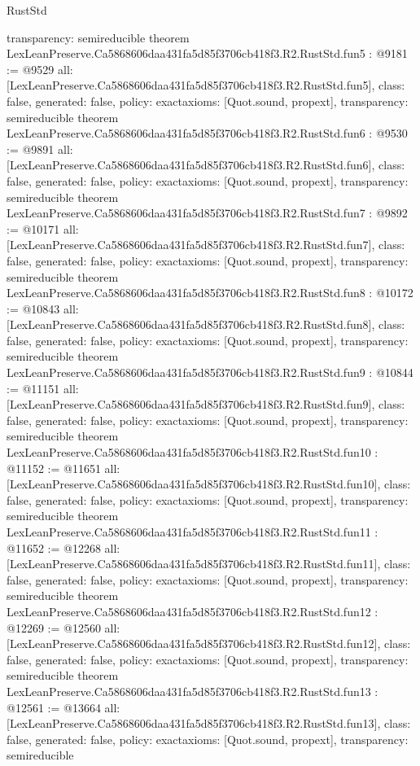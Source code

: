 \begin{lexlean}{RustStd}
\begin{coremodule}
{  transparency: semireducible
}
theorem LexLeanPreserve.Ca5868606daa431fa5d85f3706cb418f3.R2.RustStd.fun5 : @9181 := @9529 {
  all: [LexLeanPreserve.Ca5868606daa431fa5d85f3706cb418f3.R2.RustStd.fun5],
  class: false,
  generated: false,
  policy: exact{axioms: [Quot.sound, propext]},
  transparency: semireducible
}
theorem LexLeanPreserve.Ca5868606daa431fa5d85f3706cb418f3.R2.RustStd.fun6 : @9530 := @9891 {
  all: [LexLeanPreserve.Ca5868606daa431fa5d85f3706cb418f3.R2.RustStd.fun6],
  class: false,
  generated: false,
  policy: exact{axioms: [Quot.sound, propext]},
  transparency: semireducible
}
theorem LexLeanPreserve.Ca5868606daa431fa5d85f3706cb418f3.R2.RustStd.fun7 : @9892 := @10171 {
  all: [LexLeanPreserve.Ca5868606daa431fa5d85f3706cb418f3.R2.RustStd.fun7],
  class: false,
  generated: false,
  policy: exact{axioms: [Quot.sound, propext]},
  transparency: semireducible
}
theorem LexLeanPreserve.Ca5868606daa431fa5d85f3706cb418f3.R2.RustStd.fun8 : @10172 := @10843 {
  all: [LexLeanPreserve.Ca5868606daa431fa5d85f3706cb418f3.R2.RustStd.fun8],
  class: false,
  generated: false,
  policy: exact{axioms: [Quot.sound, propext]},
  transparency: semireducible
}
theorem LexLeanPreserve.Ca5868606daa431fa5d85f3706cb418f3.R2.RustStd.fun9 : @10844 := @11151 {
  all: [LexLeanPreserve.Ca5868606daa431fa5d85f3706cb418f3.R2.RustStd.fun9],
  class: false,
  generated: false,
  policy: exact{axioms: [Quot.sound, propext]},
  transparency: semireducible
}
theorem LexLeanPreserve.Ca5868606daa431fa5d85f3706cb418f3.R2.RustStd.fun10 : @11152 := @11651 {
  all: [LexLeanPreserve.Ca5868606daa431fa5d85f3706cb418f3.R2.RustStd.fun10],
  class: false,
  generated: false,
  policy: exact{axioms: [Quot.sound, propext]},
  transparency: semireducible
}
theorem LexLeanPreserve.Ca5868606daa431fa5d85f3706cb418f3.R2.RustStd.fun11 : @11652 := @12268 {
  all: [LexLeanPreserve.Ca5868606daa431fa5d85f3706cb418f3.R2.RustStd.fun11],
  class: false,
  generated: false,
  policy: exact{axioms: [Quot.sound, propext]},
  transparency: semireducible
}
theorem LexLeanPreserve.Ca5868606daa431fa5d85f3706cb418f3.R2.RustStd.fun12 : @12269 := @12560 {
  all: [LexLeanPreserve.Ca5868606daa431fa5d85f3706cb418f3.R2.RustStd.fun12],
  class: false,
  generated: false,
  policy: exact{axioms: [Quot.sound, propext]},
  transparency: semireducible
}
theorem LexLeanPreserve.Ca5868606daa431fa5d85f3706cb418f3.R2.RustStd.fun13 : @12561 := @13664 {
  all: [LexLeanPreserve.Ca5868606daa431fa5d85f3706cb418f3.R2.RustStd.fun13],
  class: false,
  generated: false,
  policy: exact{axioms: [Quot.sound, propext]},
  transparency: semireducible
}
\end{coremodule}
\end{lexlean}
